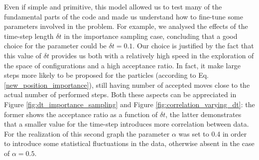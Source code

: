 Even if simple and primitive, this model allowed us to test many of the fundamental parts of the code and made us understand how to fine-tune some parameters involved in the problem. For example, we analysed the effects of the time-step length $\delta t$ in the importance sampling case, concluding that a good choice for the parameter could be $\delta t = 0.1$. Our choice is justified by the fact that this value of $\delta t$ provides us both with a relatively high speed in the exploration of the space of configurations and a high acceptance ratio. In fact, it make large steps more likely to be proposed for the particles (according to Eq.\,\ref{new_position_importance}), still having number of accepted moves close to the actual number of performed steps. Both these aspects can be appreciated in Figure \ref{fig:dt_importance_sampling} and Figure \ref{fig:correlation_varying_dt}: the former shows the acceptance ratio as a function of $\delta t$, the latter demonstrates that a smaller value for the time-step introduces more correlation between data. For the realization of this second graph the parameter $\alpha$ was set to 0.4 in order to introduce some statistical fluctuations in the data, otherwise absent in the case of $\alpha=0.5$.


